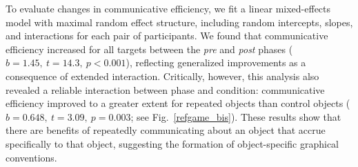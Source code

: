 \documentclass[10pt,letterpaper]{article}
\begin{document}

To evaluate changes in communicative efficiency, we fit a linear mixed-effects model with maximal random effect structure, including random intercepts, slopes, and interactions for each pair of participants.
We found that communicative efficiency increased for all targets between the \textit{pre} and \textit{post} phases ($b = 1.45,~t = 14.3,~p <0.001$), reflecting generalized improvements as a consequence of extended interaction.
Critically, however, this analysis also revealed a reliable interaction between phase and condition: communicative efficiency improved to a greater extent for repeated objects than control objects ($b = 0.648, ~t = 3.09,~p = 0.003$; see Fig.~\ref{refgame_bis}).
These results show that there are benefits of repeatedly communicating about an object that accrue specifically to that object, suggesting the formation of object-specific graphical conventions.






\end{document}
